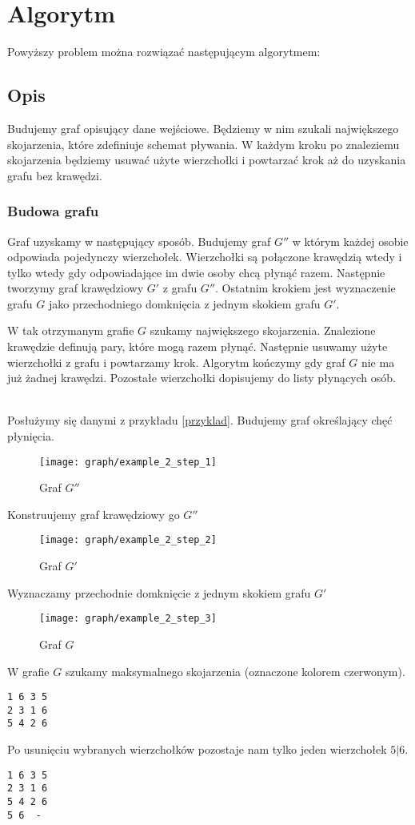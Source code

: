 \documentclass{llncs}
\begin{document}
\section{Algorytm}
Powyższy problem można rozwiązać następującym algorytmem:

\subsection{Opis}
Budujemy graf opisujący dane wejściowe. Będziemy w nim szukali 
największego skojarzenia, które zdefiniuje schemat pływania.
W każdym kroku po znaleziemu skojarzenia będziemy usuwać 
użyte wierzchołki i powtarzać krok aż do uzyskania grafu bez krawędzi.

\subsubsection{Budowa grafu}
Graf uzyskamy w następujący sposób. Budujemy
graf $G''$ w którym każdej osobie odpowiada pojedynczy 
wierzchołek. Wierzchołki są połączone krawędzią wtedy
i tylko wtedy gdy odpowiadające im dwie osoby chcą płynąć razem.
Następnie tworzymy graf krawędziowy $G'$ z grafu $G''$.
Ostatnim krokiem jest wyznaczenie grafu $G$
jako przechodniego domknięcia z jednym 
skokiem grafu $G'$.

W tak otrzymanym grafie $G$ szukamy największego 
skojarzenia. Znalezione krawędzie definują
pary, które mogą razem płynąć. Następnie usuwamy użyte
wierzchołki z grafu i powtarzamy krok.
Algorytm kończymy gdy graf $G$ nie ma już żadnej krawędzi.
Pozostałe wierzchołki dopisujemy do listy płynących
osób.
\begin{example}~\\
Posłużymy się danymi z przykładu \ref{przyklad}.
Budujemy graf określający chęć płynięcia.
\begin{figure}[H]
  \caption{Graf $G''$}
  \centering
	\texttt{[image: graph/example\_2\_step\_1]}
\end{figure}
Konstruujemy graf krawędziowy go $G''$
\begin{figure}[H]
  \caption{Graf $G'$}
  \centering
	\texttt{[image: graph/example\_2\_step\_2]}
\end{figure}
Wyznaczamy przechodnie domknięcie z jednym skokiem grafu $G'$
\begin{figure}[H]
  \caption{Graf $G$}
  \centering
	\texttt{[image: graph/example\_2\_step\_3]}
\end{figure}

W grafie $G$ szukamy maksymalnego skojarzenia (oznaczone kolorem czerwonym).
\begin{lstlisting}[title=Maksymalne skojarzenie]
1 6	3 5
2 3	1 6
5 4	2 6
\end{lstlisting}
Po usunięciu wybranych wierzchołków pozostaje nam tylko jeden 
wierzchołek $5|6$.
\begin{lstlisting}[title=Możliwy rozkład pływania]
1 6	3 5
2 3	1 6
5 4	2 6
5 6	 -
\end{lstlisting}

\end{example}
\end{document}
